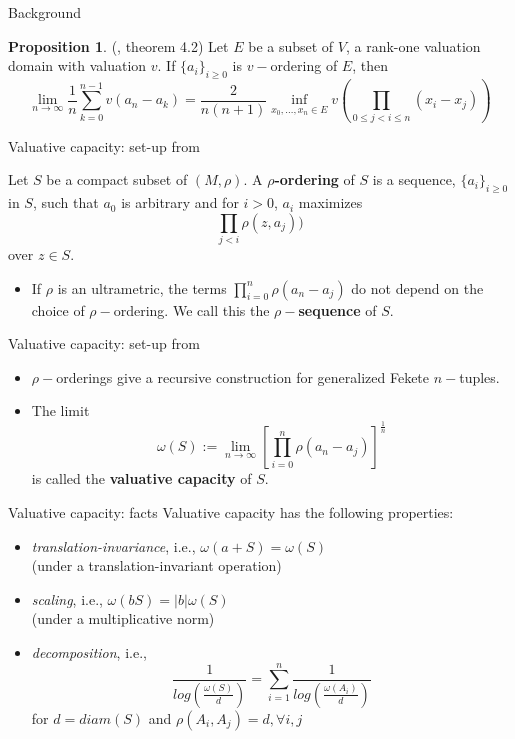 \documentclass{beamer}
\theoremstyle{definition}
\newtheorem*{proposition*}{Proposition}
\begin{document}
\begin{frame}{Background}
\begin{proposition*}
	(\cite{jlc}, theorem 4.2)	Let $E$ be a subset of $V$, a rank-one valuation domain with valuation $v$. If $\{a_i\}_{i \geq 0}$ is $v-$ordering of $E$, then
	\[\lim_{n\to\infty} \frac{1}{n} \sum_{k=0}^{n-1} v(a_n-a_k) =\frac{2}{n(n+1)} \inf_{x_0, \ldots, x_n \in E} v (\prod_{0\leq j < i \leq n} (x_i-x_j))\]
\end{proposition*}
\end{frame}

\begin{frame}{Valuative capacity: set-up from \cite{kj}}
	\begin{definition}
		 Let $S$ be a compact subset of $(M,\rho)$. A \textbf{$\rho$-ordering} of $S$ is a sequence, $\{a_i\}_{i\geq 0}$ in $S$, such that $a_0$ is arbitrary and for $i >0$, $a_i$ maximizes 
		\[ \prod_{j < i} \rho(z, a_j) )\] over $z \in S$.\\
	\end{definition}
	\pause
    \begin{itemize}
	   \item If $\rho$ is an ultrametric, the terms $\prod_{i=0}^n \rho(a_n - a_j)$ do not depend on the choice of $\rho-$ordering. We call this the \textbf{$\rho-$sequence} of $S$. \\
	\end{itemize}
\end{frame}

\begin{frame}{Valuative capacity: set-up from \cite{kj}}
	\begin{itemize}
		\item $\rho-$orderings give a recursive construction for generalized Fekete $n-$tuples.\\	
		\pause	
		\item The limit \[ \omega(S):= \lim_{n\to\infty} [\prod_{i=0}^n \rho(a_n - a_j)]^{\frac{1}{n}}\] is called the \textbf{valuative capacity} of $S$.
	\end{itemize}		  
\end{frame}

\begin{frame}{Valuative capacity: facts}
Valuative capacity has the following properties:
\begin{itemize}
	\item \textit{translation-invariance}, i.e., $\omega(a+S) = \omega(S)$\\ (under a translation-invariant operation)
	\pause
	\item \textit{scaling}, i.e., $\omega(bS) = \lvert b\rvert \omega(S)$\\ (under a multiplicative norm)
	\pause
	\item \textit{decomposition}, i.e., \[\frac{1}{log(\frac{\omega(S)}{d}) } = \sum_{i=1}^n \frac{1}{log(\frac{\omega(A_i)}{d})}\]
	for $d=diam(S)$ and $\rho(A_i, A_j)=d, \forall i,j$ 
\end{itemize}	
\end{frame}
\end{document}
